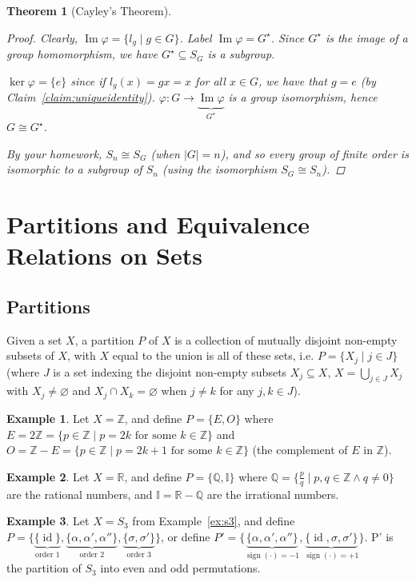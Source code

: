 \documentclass[12pt,letterpaper,DIV=11,final]{scrartcl}
\theoremstyle{plain}
\newtheorem{theorem}{Theorem}[section]
\theoremstyle{definition}
\newtheorem{example}{Example}[section]
\theoremstyle{remark}
\DeclareMathOperator{\id}{id}
\DeclareMathOperator{\sign}{sign}
\DeclareMathOperator{\ima}{Im}
\begin{document}
\begin{theorem}[Cayley's Theorem]
\begin{proof}
    Clearly, $\ima \varphi = \{ l_g \mid g \in G \}$.
    Label $\ima \varphi = G^\star$.
    Since $G^\star$ is the image of a group homomorphism, we have $G^\star \subseteq S_G$ is a subgroup.

    $\ker \varphi = \{ e \}$ since if $l_g(x) = gx = x$ for all $x \in G$, we have that $g = e$ (by Claim~\ref{claim:uniqueidentity}).
    $\varphi: G \to \underbrace{\ima \varphi}_{G^\star}$ is a group isomorphism, hence $G \cong G^\star$.

    By your homework, $S_n \cong S_G$ (when $|G| = n$), and so every group of finite order is isomorphic to a subgroup of $S_n$ (using the isomorphism $S_G \cong S_n$).
  \end{proof}
\end{theorem}

\section{Partitions and Equivalence Relations on Sets}
\subsection{Partitions}
Given a set $X$, a partition $P$ of $X$ is a collection of mutually disjoint non-empty subsets of $X$, with $X$ equal to the union is all of these sets,
i.e. $P = \{ X_j \mid j \in J \}$ (where $J$ is a set indexing the disjoint non-empty subsets $X_j \subseteq X$, $X = \bigcup_{j \in J} X_j$ with $X_j \neq \varnothing$ and $X_j \cap X_k = \varnothing$ when $j \neq k$ for any $j, k \in J$).

\begin{example}\label{ex:partition_eo}
  Let $X = \mathbb{Z}$, and define $P = \{ E, O \}$ where $E = 2 \mathbb{Z} = \{ p \in \mathbb{Z} \mid p = 2k \text{ for some $k \in \mathbb{Z}$} \}$
  and $O = \mathbb{Z} - E = \{p \in \mathbb{Z} \mid p = 2k + 1 \text{ for some $k \in \mathbb{Z}$} \}$ (the complement of $E$ in $\mathbb{Z}$).
\end{example}

\begin{example}
  Let $X = \mathbb{R}$, and define $P = \{ \mathbb{Q}, \mathbb{I} \}$ where $\mathbb{Q} = \{ \frac{p}{q} \mid p, q \in \mathbb{Z} \land q \neq 0 \}$ are the rational numbers,
  and $\mathbb{I} = \mathbb{R} - \mathbb{Q}$ are the irrational numbers.
\end{example}

\begin{example}\label{ex:partition_s3}
  Let $X = S_3$ from Example~\ref{ex:s3},
  and define $P = \{ \underbrace{\{ \id \}}_\text{order 1}, \underbrace{\{ \alpha, \alpha', \alpha'' \}}_\text{order 2}, \underbrace{\{ \sigma, \sigma' \}}_\text{order 3} \}$,
  or define $P' = \{ \underbrace{\{ \alpha, \alpha', \alpha'' \}}_{\sign(\cdot) = -1}, \underbrace{\{ \id, \sigma, \sigma' \}}_{\sign(\cdot) = +1} \}$.
  P' is the partition of $S_3$ into even and odd permutations.
\end{example}
\end{document}
